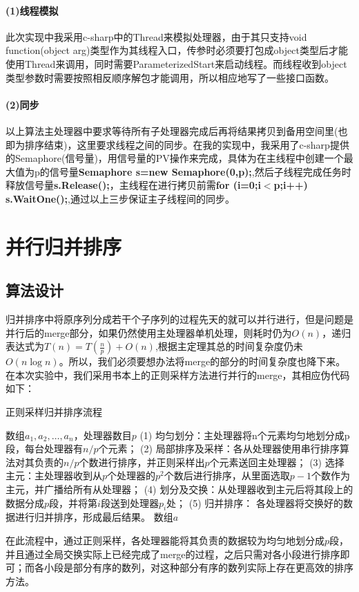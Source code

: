 \documentclass[UTF8]{article}
\begin{document}
\paragraph{(1)线程模拟} 此次实现中我采用c-sharp中的Thread来模拟处理器，由于其只支持void function(object arg)类型作为其线程入口，传参时必须要打包成object类型后才能使用Thread来调用，同时需要ParameterizedStart来启动线程。而线程收到object类型参数时需要按照相反顺序解包才能调用，所以相应地写了一些接口函数。
\paragraph{(2)同步} 以上算法主处理器中要求等待所有子处理器完成后再将结果拷贝到备用空间里(也即为排序结束)，这里要求线程之间的同步。在我的实现中，我采用了c-sharp提供的Semaphore(信号量)，用信号量的PV操作来完成，具体为在主线程中创建一个最大值为p的信号量\textbf{Semaphore s=new Semaphore(0,p);},然后子线程完成任务时释放信号量\textbf{s.Release();}，主线程在进行拷贝前需\textbf{for (i=0;i$<$p;i++) s.WaitOne();},通过以上三步保证主子线程间的同步。
\section{并行归并排序}
\subsection{算法设计}
归并排序中将原序列分成若干个子序列的过程先天的就可以并行进行，但是问题是并行后的merge部分，如果仍然使用主处理器单机处理，则耗时仍为$O(n)$，递归表达式为$T(n)=T(\frac{n}{p})+O(n)$,根据主定理其总的时间复杂度仍未$O(n\log n)$。所以，我们必须要想办法将merge的部分的时间复杂度也降下来。在本次实验中，我们采用书本上的正则采样方法进行并行的merge，其相应伪代码如下：\\
\begin{algorithm}
	\caption{正则采样归并排序流程}	
	\begin{algorithmic}[1]
		\Require 数组$a_1,a_2,\ldots,a_n$，处理器数目$p$  
		\State (1) 均匀划分：主处理器将n个元素均匀地划分成p段，每台处理器有$n/p$个元素；
		\State (2) 局部排序及采样：各从处理器使用串行排序算法对其负责的$n/p$个数进行排序，并正则采样出$p$个元素送回主处理器；
		\State (3) 选择主元：主处理器收到从$p$个处理器的$p^2$个数后进行排序，从里面选取$p-1$个数作为主元，并广播给所有从处理器；
		\State (4) 划分及交换：从处理器收到主元后将其段上的数据分成$p$段，并将第$i$段送到处理器$p_i$处；
		\State (5) 归并排序： 各处理器将交换好的数据进行归并排序，形成最后结果。
		\State \Return 数组$a$
		\EndFunction
	\end{algorithmic}
\end{algorithm}
在此流程中，通过正则采样，各处理器能将其负责的数据较为均匀地划分成$p$段，并且通过全局交换实际上已经完成了merge的过程，之后只需对各小段进行排序即可；而各小段是部分有序的数列，对这种部分有序的数列实际上存在更高效的排序方法。
\end{document}
